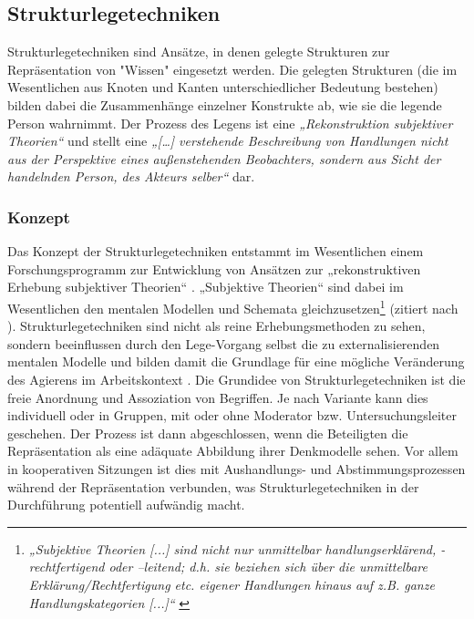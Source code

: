 
\subsection{Strukturlegetechniken} %
\label{sub:strukturlegetechniken}

Strukturlegetechniken sind Ansätze, in denen gelegte Strukturen zur Repräsentation von "Wissen" eingesetzt werden. Die gelegten Strukturen (die im Wesentlichen aus Knoten und Kanten unterschiedlicher Bedeutung bestehen) bilden dabei die Zusammenhänge einzelner Konstrukte ab, wie sie die legende Person wahrnimmt. Der Prozess des Legens ist eine \emph{„Rekonstruktion subjektiver Theorien“} \citep{Dann92} und stellt eine \emph{„[\ldots] verstehende Beschreibung von Handlungen nicht aus der Perspektive eines außenstehenden Beobachters, sondern aus Sicht der handelnden Person, des Akteurs selber“} \citep{Dann92} dar.

\subsubsection{Konzept}

Das Konzept der Strukturlegetechniken entstammt im Wesentlichen einem Forschungsprogramm zur Entwicklung von Ansätzen zur „rekonstruktiven Erhebung subjektiver Theorien“ \citep{Dann92}. „Subjektive Theorien“ sind dabei im Wesentlichen den mentalen Modellen und Schemata gleichzusetzen\footnote{\emph{„Subjektive Theorien [...] sind nicht nur unmittelbar handlungserklärend, -rechtfertigend oder –leitend; d.h. sie beziehen sich über die unmittelbare Erklärung/Rechtfertigung etc. eigener Handlungen hinaus auf z.B. ganze Handlungskategorien [...]“} \citep[][S. 34]{Scheele88}} \citep{Kluwe90} (zitiert nach \citep{Huss03}). Strukturlegetechniken sind nicht als reine Erhebungsmethoden zu sehen, sondern beeinflussen durch den Lege-Vorgang selbst die zu externalisierenden mentalen Modelle und bilden damit die Grundlage für eine mögliche Veränderung des Agierens im Arbeitskontext \citep[][S. 6]{Dann92}.
Die Grundidee von Strukturlegetechniken ist die freie Anordnung und Assoziation von Begriffen. Je nach Variante kann dies individuell oder in Gruppen, mit oder ohne Moderator bzw. Untersuchungsleiter geschehen. Der Prozess ist dann abgeschlossen, wenn die Beteiligten die Repräsentation als eine adäquate Abbildung ihrer Denkmodelle sehen. Vor allem in kooperativen Sitzungen ist dies mit Aushandlungs- und Abstimmungsprozessen während der Repräsentation verbunden, was Strukturlegetechniken in der Durchführung potentiell aufwändig macht.

